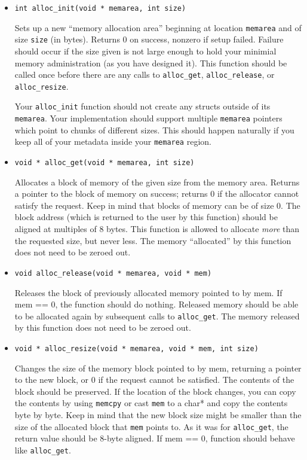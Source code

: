 \documentclass[12pt]{article}
\begin{document}
\begin{itemize}

\item \texttt{int alloc\_init(void * memarea, int size)} 

Sets up a new ``memory allocation area'' beginning at location \texttt{memarea} and of size \texttt{size} (in bytes). Returns 0 on success, nonzero if setup failed. Failure should occur if the size given is not large enough to hold your minimial memory administration (as you have designed it). This function should be called once before there are any calls to \texttt{alloc\_get},  \texttt{alloc\_release}, or  \texttt{alloc\_resize}. 

Your \texttt{alloc\_init} function should not create any structs outside of its \texttt{memarea}. Your implementation should support multiple \texttt{memarea} pointers which point to chunks of different sizes. This should happen naturally if you keep all of your metadata inside your \texttt{memarea} region.

\item \texttt{void * alloc\_get(void * memarea, int size)}

Allocates a block of memory of the given size from the memory area. Returns a pointer to the block of memory on success; returns 0 if the allocator cannot satisfy the request. Keep in mind that blocks of memory can be of size 0. The block address (which is returned to the user by this function) should be aligned at multiples of 8 bytes. This function is allowed to allocate \emph{more} than the requested size, but never less. The memory ``allocated'' by this function does not need to be zeroed out.

\item \texttt{void alloc\_release(void * memarea, void * mem)}

Releases the block of previously allocated memory pointed to by mem. If mem == 0, the function should do nothing. Released memory should be able to be allocated again by subsequent calls to \texttt{alloc\_get}. The memory released by this function does not need to be zeroed out.

\item \texttt{void * alloc\_resize(void * memarea, void * mem, int size)}

Changes the size of the memory block pointed to by mem, returning a pointer to the new block, or 0 if the request cannot be satisfied. The contents of the block should be preserved. If the location of the block changes, you can copy the contents by using \texttt{memcpy} or cast \texttt{mem} to a char* and copy the contents byte by byte. Keep in mind that the new block size might be smaller than the size of the allocated block that \texttt{mem} points to. As it was for \texttt{alloc\_get}, the return value should be 8-byte aligned. If mem == 0, function should behave like \texttt{alloc\_get}.

\end{itemize}
\end{document}
